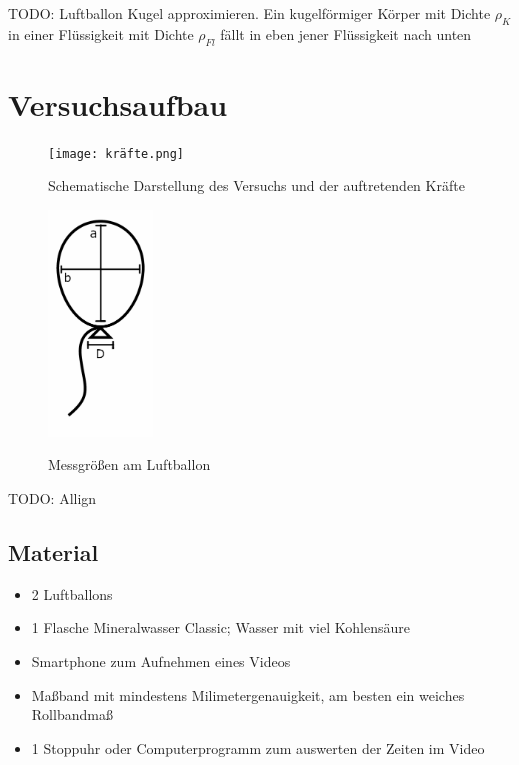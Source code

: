 \documentclass{article}
\begin{document}
    TODO: Luftballon Kugel approximieren. Ein kugelförmiger Körper mit Dichte \(\rho_K\) in einer Flüssigkeit mit Dichte \(\rho_{Fl}\) fällt in eben jener Flüssigkeit nach unten

    \section{Versuchsaufbau}
        \begin{figure}[h]
            \centering
            \begin{minipage}[t]{0.4\textwidth}\label{fig:versuch_schematik}
                \texttt{[image: kräfte.png]}
                \caption{Schematische Darstellung des Versuchs und der auftretenden Kräfte}
            \end{minipage}
            \hfill
            \begin{minipage}[t]{0.4\textwidth}\label{fig:abmessungen}
                \includegraphics[height=6cm]{luftballons.png}
                \caption{Messgrößen am Luftballon}
            \end{minipage}
        \end{figure} TODO: Allign

        \subsection{Material}
        \begin{itemize}
            \item 2 Luftballons
            \item 1 Flasche Mineralwasser Classic; Wasser mit viel Kohlensäure
            \item Smartphone zum Aufnehmen eines Videos
            \item Maßband mit mindestens Milimetergenauigkeit, am besten ein weiches Rollbandmaß
            \item 1 Stoppuhr oder Computerprogramm zum auswerten der Zeiten im Video
        \end{itemize}
\end{document}

